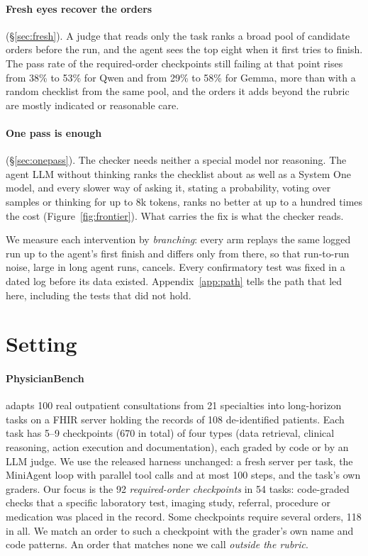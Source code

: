 \documentclass[11pt]{article}
\begin{document}
\paragraph{Fresh eyes recover the orders} (\S\ref{sec:fresh}). A judge that reads only the task ranks a broad pool of
candidate orders before the run, and the agent sees the top eight when it first tries to finish. The pass rate of the
required-order checkpoints still failing at that point rises from 38\% to 53\% for Qwen and from 29\% to 58\% for
Gemma, more than with a random checklist from the same pool, and the orders it adds beyond the rubric are mostly
indicated or reasonable care.

\paragraph{One pass is enough} (\S\ref{sec:onepass}). The checker needs neither a special model nor reasoning. The
agent LLM without thinking ranks the checklist about as well as a System One model, and every slower way of asking
it, stating a probability, voting over samples or thinking for up to 8k tokens, ranks no better at up to a hundred
times the cost (Figure~\ref{fig:frontier}). What carries the fix is what the checker reads.

\medskip
We measure each intervention by \emph{branching}: every arm replays the same logged run up to the agent's first
finish and differs only from there, so that run-to-run noise, large in long agent runs, cancels. Every confirmatory
test was fixed in a dated log before its data existed. Appendix~\ref{app:path} tells the path that led here,
including the tests that did not hold.

\section{Setting}\label{sec:setup}

\paragraph{PhysicianBench} \citep{physicianbench2026} adapts 100 real outpatient consultations from 21 specialties into
long-horizon tasks on a FHIR server holding the records of 108 de-identified patients. Each task has 5--9
checkpoints (670 in total) of four types (data retrieval, clinical reasoning, action execution and documentation),
each graded by code or by an LLM judge. We use the released harness unchanged: a fresh server per task, the MiniAgent
loop with parallel tool calls and at most 100 steps, and the task's own graders. Our focus is the 92
\emph{required-order checkpoints} in 54 tasks: code-graded checks that a specific laboratory test, imaging study,
referral, procedure or medication was placed in the record. Some checkpoints require several orders, 118 in all. We
match an order to such a checkpoint with the grader's own name and code patterns. An order that matches none we call
\emph{outside the rubric}.
\end{document}

